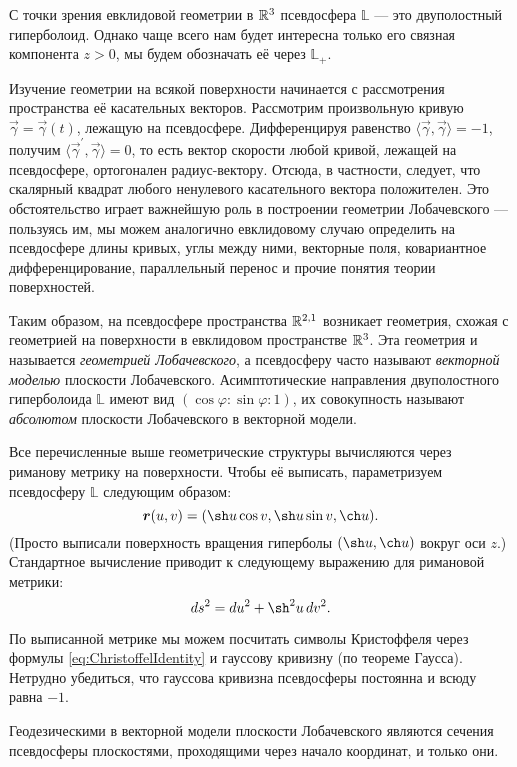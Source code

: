 С точки зрения евклидовой геометрии в $\mathbb{R}^3$ псевдосфера $\mathbb{L}$ --- это двуполостный гиперболоид. Однако чаще всего нам будет интересна только его связная компонента $z > 0$, мы будем обозначать её через $\mathbb{L}_+$.

Изучение геометрии на всякой поверхности начинается с рассмотрения пространства её касательных векторов. Рассмотрим произвольную кривую $\vec{\gamma} = \vec{\gamma}(t)$, лежащую на псевдосфере. Дифференцируя равенство $\langle\vec{\gamma}, \vec{\gamma}\rangle = -1$, получим $\langle\vec{\gamma}^\prime, \vec{\gamma}\rangle = 0$, то есть вектор скорости любой кривой, лежащей на псевдосфере, ортогонален радиус-вектору. Отсюда, в частности, следует, что скалярный квадрат любого ненулевого касательного вектора положителен. Это обстоятельство играет важнейшую роль в построении геометрии Лобачевского --- пользуясь им, мы можем аналогично евклидовому случаю определить на псевдосфере длины кривых, углы между ними, векторные поля, ковариантное дифференцирование, параллельный перенос и прочие понятия теории поверхностей.

Таким образом, на псевдосфере пространства $\mathbb{R}^{2, 1}$ возникает геометрия, схожая с геометрией на поверхности в евклидовом пространстве $\mathbb{R}^3$. Эта геометрия и называется \textit{геометрией Лобачевского}, а псевдосферу часто называют \textit{векторной моделью} плоскости Лобачевского. Асимптотические направления двуполостного гиперболоида $\mathbb{L}$ имеют вид $(\cos\varphi : \sin\varphi : 1)$, их совокупность называют \textit{абсолютом} плоскости Лобачевского в векторной модели.

Все перечисленные выше геометрические структуры вычисляются через риманову метрику на поверхности. Чтобы её выписать, параметризуем псевдосферу $\mathbb{L}$ следующим образом:
\[
	\vec{r}(u, v) = (\sh u\cos v, \sh u\sin v, \ch u).
\]
(Просто выписали поверхность вращения гиперболы $(\sh u, \ch u)$ вокруг оси $z$.) Стандартное вычисление приводит к следующему выражению для римановой метрики:
\[
	ds^2 = du^2 + \sh^2u\,dv^2.
\]

По выписанной метрике мы можем посчитать символы Кристоффеля через формулы \eqref{eq:ChristoffelIdentity} и гауссову кривизну (по теореме Гаусса). Нетрудно убедиться, что гауссова кривизна псевдосферы постоянна и всюду равна $-1$.

\begin{theorem}
	Геодезическими в векторной модели плоскости Лобачевского являются сечения псевдосферы плоскостями, проходящими через начало координат, и только они.
\end{theorem}

